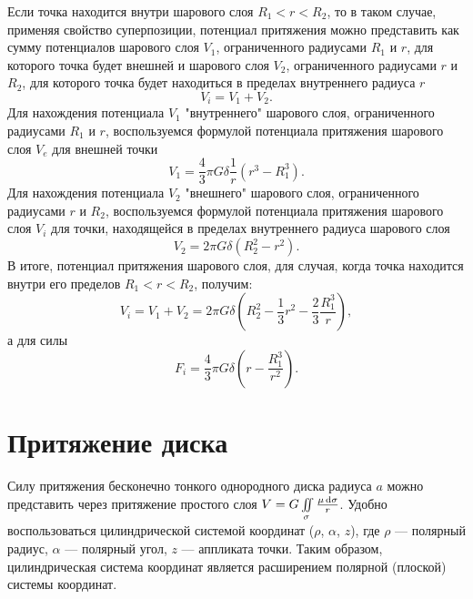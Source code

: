 \documentclass[11pt, a4paper]{article}
\theoremstyle{plain}
\theoremstyle{definition}
\theoremstyle{remark}
\begin{document}
Если точка находится внутри шарового слоя $R_1 < r < R_2$, то в таком случае, применяя свойство суперпозиции, потенциал притяжения можно представить как сумму потенциалов  шарового слоя $V_1$, ограниченного радиусами $R_1$ и $r$, для которого точка будет внешней и шарового слоя $V_2$, ограниченного радиусами $r$ и $R_2$, для которого точка будет находиться в пределах внутреннего радиуса $r$
\begin{equation*}
    V_i = V_1 + V_2.
\end{equation*}
Для нахождения потенциала $V_1$ "внутреннего" шарового слоя, ограниченного радиусами $R_1$ и $r$, воспользуемся формулой потенциала притяжения шарового слоя $V_e$ для внешней точки
\begin{equation*}
    V_1 = \dfrac{4}{3}\pi G\delta \dfrac{1}{r} \left( r^3 - R_1^3 \right).
\end{equation*}
Для нахождения потенциала $V_2$ "внешнего" шарового слоя, ограниченного радиусами $r$ и $R_2$, воспользуемся формулой потенциала притяжения шарового слоя $V_i$ для точки, находящейся в пределах внутреннего радиуса шарового слоя
\begin{equation*}
    V_2 = 2\pi G\delta \left( R_2^2 - r^2 \right).
\end{equation*}
В итоге, потенциал притяжения шарового слоя, для случая, когда точка находится внутри его пределов  $R_1 < r < R_2$, получим:
\begin{equation*}
    V_i = V_1 + V_2 = 2\pi G\delta \left(R_2^2 - \dfrac{1}{3}r^2 - \dfrac{2}{3}\dfrac{R_1^3}{r}\right),
\end{equation*}
а для силы
\begin{equation*}
    F_i = \dfrac{4}{3}\pi G\delta \left(r - \dfrac{R_1^3}{r^2} \right).
\end{equation*}

\section{Притяжение диска}
Силу притяжения бесконечно тонкого однородного диска радиуса $a$ можно представить
через притяжение простого слоя $V = G\iint\limits_{\sigma}\frac{\mu\dif\sigma}{r}$.
Удобно воспользоваться цилиндрической системой координат ($\rho$, $\alpha$, $z$), где $\rho$ ---
полярный радиус, $\alpha$ --- полярный угол, $z$ --- аппликата точки. Таким образом, цилиндрическая
система координат является расширением полярной (плоской) системы координат.
\end{document}
